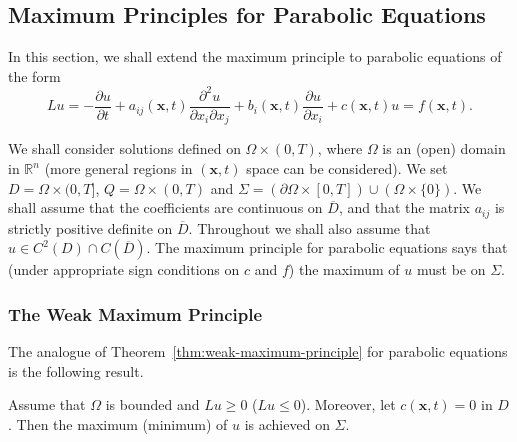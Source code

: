 \subsection{Maximum Principles for Parabolic Equations}\label{sec:parabolic-maximum-principles}

In this section, we shall extend the maximum principle to parabolic equations of the form
\begin{equation}\label{eq:parabolic-maximum-principle-operator}
Lu=-\dfrac{\partial u}{\partial t}+a_{ij}(\bm{x},t)\dfrac{\partial^2u}{\partial x_i\partial x_j}+b_i(\bm{x},t)\dfrac{\partial u}{\partial x_i}+c(\bm{x},t)u=f(\bm{x},t).
\end{equation}


We shall consider solutions defined on $\Omega\times(0,T)$, where $\Omega$ is an (open) domain in $\mathbb{R}^n$ (more general regions in $(\bm{x},t)$ space can be considered). We set $D=\Omega\times(0,T]$, $Q=\Omega\times(0,T)$ and $\Sigma=(\partial\Omega\times[0,T])\cup(\Omega\times\{0\})$. We shall assume that the coefficients are continuous on $\overline D$, and that the matrix $a_{ij}$ is strictly positive definite on $\overline D$. Throughout we shall also assume that $u\in C^2(D)\cap C(\overline D)$. The maximum principle for parabolic equations says that (under appropriate sign conditions on $c$ and $f$) the maximum of $u$ must be on $\Sigma$.

\subsubsection{The Weak Maximum Principle}\label{subsec:parabolic-weak-maximum}

The analogue of Theorem~\ref{thm:weak-maximum-principle} for parabolic equations is the following result.

\begin{Theorem}
\label{thm:parabolic-weak-maximum}
Assume that $\Omega$ is bounded and $Lu\geq0$ ($Lu\leq0$). Moreover, let $c(\bm{x},t)=0$ in $D$. Then the maximum (minimum) of $u$ is achieved on $\Sigma$.
\end{Theorem}

